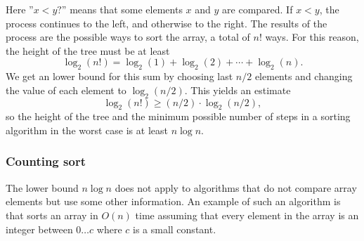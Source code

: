 \begin{center}
\end{center}

Here ''$x<y?$'' means that some elements
$x$ and $y$ are compared.
If $x<y$, the process continues to the left,
and otherwise to the right.
The results of the process are the possible
ways to sort the array, a total of $n!$ ways.
For this reason, the height of the tree
must be at least
\[ \log_2(n!) = \log_2(1)+\log_2(2)+\cdots+\log_2(n).\]
We get an lower bound for this sum
by choosing last $n/2$ elements and
changing the value of each element to $\log_2(n/2)$.
This yields an estimate
\[ \log_2(n!) \ge (n/2) \cdot \log_2(n/2),\]
so the height of the tree and the minimum
possible number of steps in a sorting
algorithm in the worst case
is at least $n \log n$.

\subsubsection{Counting sort}


The lower bound $n \log n$ does not apply to
algorithms that do not compare array elements
but use some other information.
An example of such an algorithm is
 that sorts an array in
$O(n)$ time assuming that every element in the array
is an integer between $0 \ldots c$ where $c$
is a small constant.

